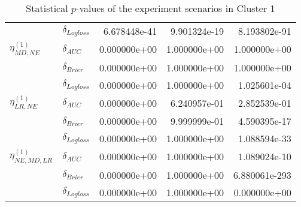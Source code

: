 \begin{table}[!h]
\begin{tabular}{l|lrrr}
                              & $\delta_{Logloss}$ &           6.678448e-41 &     9.901324e-19 &             8.193802e-91 \\
    $\eta^{(1)}_{MD, NE}$ & $\delta_{AUC}$ &           0.000000e+00 &     1.000000e+00 &             1.000000e+00 \\
                              & $\delta_{Brier}$ &           0.000000e+00 &     1.000000e+00 &             1.000000e+00 \\
                              & $\delta_{Logloss}$ &           0.000000e+00 &     1.000000e+00 &             1.025601e-04 \\
    $\eta^{(1)}_{LR, NE}$ & $\delta_{AUC}$ &           0.000000e+00 &     6.240957e-01 &             2.852539e-01 \\
                              & $\delta_{Brier}$ &           0.000000e+00 &     9.999999e-01 &             4.590395e-17 \\
                              & $\delta_{Logloss}$ &           0.000000e+00 &     1.000000e+00 &             1.088594e-33 \\
    $\eta^{(1)}_{NE, MD, LR}$ & $\delta_{AUC}$ &           0.000000e+00 &     1.000000e+00 &             1.089024e-10 \\
                              & $\delta_{Brier}$ &           0.000000e+00 &     1.000000e+00 &            6.880061e-293 \\
                              & $\delta_{Logloss}$ &           0.000000e+00 &     1.000000e+00 &             0.000000e+00 \\
    \bottomrule
    \end{tabular}
    \caption{Statistical $p$-values of the experiment scenarios in Cluster 1}
    \end{table}
    
